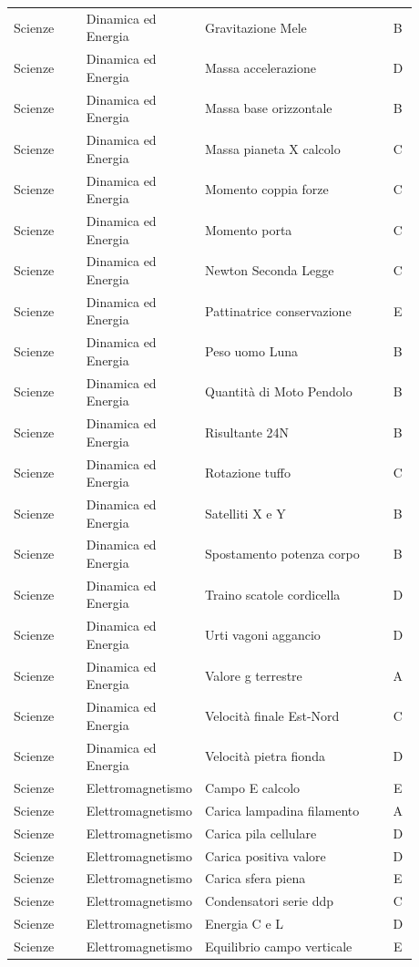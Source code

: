 \documentclass[20pt, a4paper]{article}
\begin{document}
\begin{longtable}{@{}>{\raggedright\arraybackslash}p{0.18\linewidth}>{\raggedright\arraybackslash}p{0.24\linewidth}>{\raggedright\arraybackslash}p{0.46\linewidth}c@{}}
Scienze & Dinamica ed Energia & Gravitazione Mele & B \\
Scienze & Dinamica ed Energia & Massa accelerazione & D \\
Scienze & Dinamica ed Energia & Massa base orizzontale & B \\
Scienze & Dinamica ed Energia & Massa pianeta X calcolo & C \\
Scienze & Dinamica ed Energia & Momento coppia forze & C \\
Scienze & Dinamica ed Energia & Momento porta & C \\
Scienze & Dinamica ed Energia & Newton Seconda Legge & C \\
Scienze & Dinamica ed Energia & Pattinatrice conservazione & E \\
Scienze & Dinamica ed Energia & Peso uomo Luna & B \\
Scienze & Dinamica ed Energia & Quantità di Moto Pendolo & B \\
Scienze & Dinamica ed Energia & Risultante 24N & B \\
Scienze & Dinamica ed Energia & Rotazione tuffo & C \\
Scienze & Dinamica ed Energia & Satelliti X e Y & B \\
Scienze & Dinamica ed Energia & Spostamento potenza corpo & B \\
Scienze & Dinamica ed Energia & Traino scatole cordicella & D \\
Scienze & Dinamica ed Energia & Urti vagoni aggancio & D \\
Scienze & Dinamica ed Energia & Valore g terrestre & A \\
Scienze & Dinamica ed Energia & Velocità finale Est-Nord & C \\
Scienze & Dinamica ed Energia & Velocità pietra fionda & D \\
Scienze & Elettromagnetismo & Campo E calcolo & E \\
Scienze & Elettromagnetismo & Carica lampadina filamento & A \\
Scienze & Elettromagnetismo & Carica pila cellulare & D \\
Scienze & Elettromagnetismo & Carica positiva valore & D \\
Scienze & Elettromagnetismo & Carica sfera piena & E \\
Scienze & Elettromagnetismo & Condensatori serie ddp & C \\
Scienze & Elettromagnetismo & Energia C e L & D \\
Scienze & Elettromagnetismo & Equilibrio campo verticale & E \\

\end{longtable}
\end{document}

